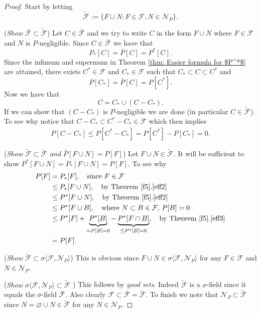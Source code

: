 \begin{proof}
Start by letting
\[
\widetilde{\mathcal F} :=\{F\cup N: F\in \mathcal F, N\in \mathcal N_P  \}.
\]

({\sl Show $\bar{\mathcal F}\subset \widetilde{\mathcal F}$})
Let $C\in \bar{\mathcal F}$ and we try to write $C$ in the form $F\cup N$ where $F\in \mathcal F$ and $N$ is $P$-negligible. Since  $C\in \bar{\mathcal F}$ we have that
\[ P_*[C] = \bar P[C] = P^*[C]. \]
Since the infimum and supermum in Theorem \ref{thm: Easier formula for $P^*$} are attained,
 there exists $C^*\in\mathcal F$ and $C_*\in \mathcal F$ such that $C_* \subset C\subset C^*$ and
\[ P[C_*] = \bar P[C] = P[C^*]. \]
Now we have that
\[
C = C_* \cup (C-C_*).
\]
If we can show that $(C-C_*)$ is $P$-negligible we are done (in particular $C\in \widetilde{\mathcal F}$). To see why notice that $C-C_*  \subset C^*-C_* \in \mathcal F$ which then implies
\begin{align*}
 P[C-C_*]\leq P[C^*-C_*] = P[C^*]-P[C_*] = 0.
\end{align*}

({\sl Show $\widetilde{\mathcal F}\subset \bar{\mathcal F}$ and $\bar P[F\cup N] = P[F]$}) Let $F\cup N\in \widetilde{\mathcal F}$. It will be sufficient to show $P^*[F\cup N] = P_*[F\cup N] = P[F]$. To see why
\begin{align*}
P[F] &= P_*[F],\quad\text{since $F\in \mathcal F$} \\
&\leq P_*[F\cup N],\quad\text{by Theorem \ref{f5}.\ref{eff2}} \\
&\leq P^*[F\cup N],\quad\text{by Theorem \ref{f5}.\ref{eff2}} \\
&\leq P^*[F\cup B],\quad\text{where $N\subset B\in \mathcal F$, $P[B]=0$} \\
&\leq P^*[F] + \underbrace{P^*[B]}_{=P[B]=0} - \underbrace{P^*[F\cap B]}_{\leq P^*[B]=0},\quad\text{by Theorem \ref{f5}.\ref{eff3}} \\
&= P[F].
\end{align*}

({\sl Show $\widetilde{\mathcal F}\subset \sigma\langle \mathcal F, \mathcal N_P  \rangle$}) This is obvious since $F\cup N \in  \sigma\langle \mathcal F, \mathcal N_P  \rangle$ for any $F\in \mathcal F$ and $N\in \mathcal N_P$.

({\sl Show $\sigma\langle \mathcal F,  \mathcal N_P  \rangle\subset \widetilde{\mathcal F}$ }) This follows by {\sl good sets}. Indeed  $\widetilde{\mathcal F}$ is a $\sigma$-field since it equals the $\sigma$-field $\bar{\mathcal F}$. Also clearly $\mathcal F\subset \bar{\mathcal F} = \widetilde{\mathcal F}$. To finish we note that $\mathcal N_P\subset \widetilde{\mathcal F}$ since $N = \varnothing \cup N\in \widetilde{\mathcal  F}$ for any $N\in \mathcal N_P$.
\end{proof}






